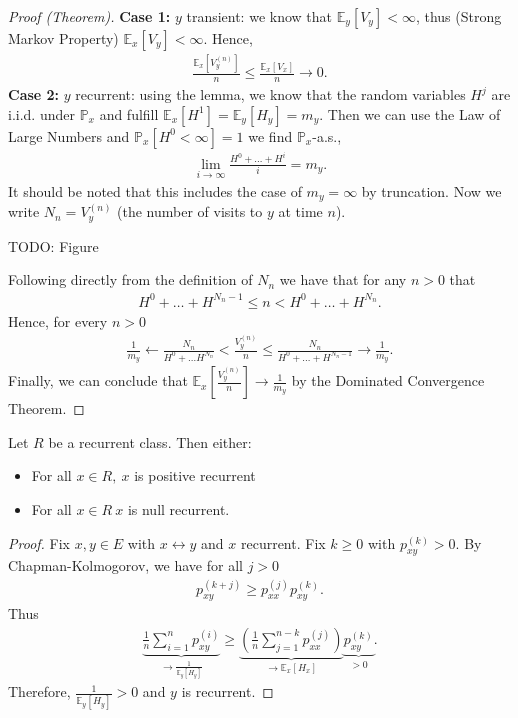 \begin{proof}[Proof (Theorem)]
	\textbf{Case 1:} $y$ transient:	we know that $\mathbb{E}_{y} \left[ V_y \right] < \infty$, thus (Strong Markov Property) $\mathbb{E}_{x} \left[ V_y \right] < \infty$. Hence,
	\begin{align}
		\frac{\mathbb{E}_{x} \left[ V_y^{(n)} \right] }{n} \leq \frac{\mathbb{E}_{x} \left[ V_x \right] }{n} \to 0
	.\end{align}
	\textbf{Case 2:} $y$ recurrent: using the lemma, we know that the random variables $H^j$ are i.i.d. under $\mathbb{P}_{x}$ and fulfill $\mathbb{E}_{x} \left[ H^1 \right] = \mathbb{E}_{y} \left[ H_y \right]  = m_y$. Then we can use the Law of Large Numbers and $\mathbb{P}_{x} \left[ H^0 < \infty \right] =1$ we find $\mathbb{P}_{x}$-a.s.,
	\begin{align}
		\lim_{i\to \infty } \frac{H^0 + \ldots + H^i}{i} = m_y
	.\end{align}
	It should be noted that this includes the case of $m_y=\infty$ by truncation. Now we write $N_n = V_y^{(n)}$ (the number of visits to $y$ at time $n$).

	TODO: Figure

Following directly from the definition of $N_n$ we have that for any $n> 0$ that 
\begin{align}
	H^0 + \ldots + H^{N_n -1} \leq n < H^0 + \ldots + H^{N_n}
.\end{align}
Hence, for every $n> 0$ 
\begin{align}
	\frac{1}{m_y} \leftarrow \frac{N_n}{H^0 + \ldots H^{N_n}} < \frac{V_y^{(n)}}{n} \leq \frac{N_n}{H^0 + \ldots + H^{N_n -1}} \to \frac{1}{m_y}
.\end{align}
Finally, we can conclude that $\mathbb{E}_{x} \left[ \frac{V_y^{(n)}}{n} \right] \to \frac{1}{m_y}$ by the Dominated Convergence Theorem.
\end{proof}


\begin{prop}
	Let $R$ be a recurrent class. Then either:
\begin{itemize}
	\item For all $x \in R,\ x$ is positive recurrent
	\item For all $x \in R\ x$ is null recurrent.
\end{itemize}
\end{prop}
\begin{proof}
	Fix $x,y \in E$ with $x  \leftrightarrow  y$ and $x$ recurrent. Fix $k\geq 0$ with $p_{xy}^{(k)}>0$. By Chapman-Kolmogorov, we have for all $j> 0$
	\begin{align}
		p_{xy}^{(k+j)} \geq p_{xx}^{(j)} p_{xy}^{(k)}	
.	\end{align}
Thus	
\begin{align}
	\underbrace{\frac{1}{n} \sum_{i=1}^{n} p_{xy}^{(i)}}_{\to  \frac{1}{\mathbb{E}_{y} \left[ H_y \right] }} \geq \underbrace{\left( \frac{1}{n} \sum_{j=1}^{n-k} p_{xx}^{(j)} \right)}_{\to \mathbb{E}_{x} \left[ H_x \right]} \underbrace{p_{xy}^{(k)}}_{>0}
.\end{align}
Therefore, $\frac{1}{\mathbb{E}_{y} \left[ H_y \right] }> 0$ and $y$ is recurrent.
\end{proof}



